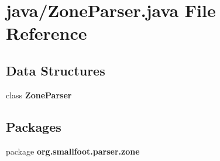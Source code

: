 \section{java/\-Zone\-Parser.java File Reference}
\label{ZoneParser_8java}
\subsection*{Data Structures}
\begin{DoxyCompactItemize}
\item 
class {\bf Zone\-Parser}
\end{DoxyCompactItemize}
\subsection*{Packages}
\begin{DoxyCompactItemize}
\item 
package {\bf org.\-smallfoot.\-parser.\-zone}
\end{DoxyCompactItemize}
